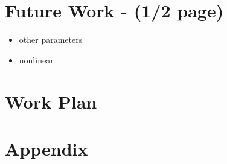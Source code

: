 \documentclass[11pt]{article}
\begin{document}
\section{Future Work - (1/2 page)}
\begin{itemize}
    \item other parameters
    \item nonlinear
\end{itemize}

\section{Work Plan}



\section*{Appendix}
\end{document}
